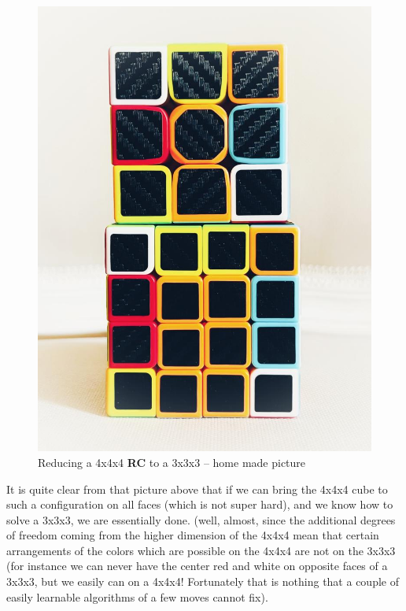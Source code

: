 \begin{figure}[H]
\centering
\includegraphics[scale=0.3]{./Figures/RC333444}
\decoRule
\caption[Reducing RC]{Reducing a 4x4x4 \textbf{RC} to a 3x3x3 -- home made picture}
\end{figure}


 It is quite clear from that picture above that if we can bring the 4x4x4 cube to such a configuration on all faces (which is not super hard), and we know how to solve a 3x3x3, we are essentially done. (well, almost, since the additional degrees of freedom coming from the higher dimension of the 4x4x4 mean that certain arrangements of the colors which are possible on the 4x4x4 are not on the 3x3x3 (for instance we can never have the center red and white on opposite faces of a 3x3x3, but we easily can on a 4x4x4! Fortunately that is nothing that a couple of easily learnable algorithms of a few moves cannot fix).




